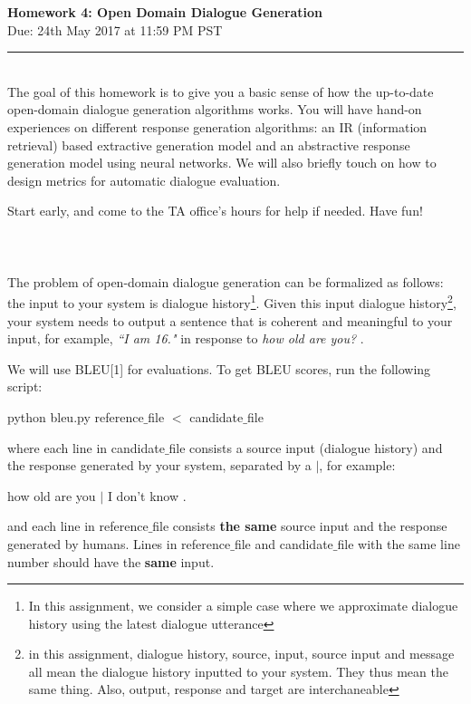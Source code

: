 \documentclass{article}
\newcommand{\ruleskip}{\bigskip\hrule\bigskip}
\begin{document}
\pagestyle{myheadings} 

\begin{center}
\Large{{\bf Homework 4: Open Domain Dialogue Generation}}\\
\large{Due: 24th May 2017 at 11:59 PM PST} 
\end{center}
\ruleskip

\\
The goal of this homework is to give you a basic sense of how the up-to-date open-domain dialogue generation algorithms works. 
You will have hand-on experiences on different response generation algorithms: an IR (information retrieval) based extractive generation model and an 
abstractive response generation model using neural networks. We will also briefly touch on how to design  metrics for automatic dialogue evaluation. 

Start early, and come to the TA office's hours for help if needed. Have fun! 
~~\\~~\\~~\\
\\
The problem of open-domain dialogue generation
 can be formalized as follows: 
the input to your system is dialogue history\footnote{In this assignment, we consider a simple case where we approximate dialogue history using the latest dialogue utterance}. 
Given this input dialogue history\footnote{in this assignment, dialogue history, source, input, source input and message all mean the dialogue history inputted to your system. They thus mean the same thing. Also, output, response and target are interchaneable}, your system needs to output a sentence  that is coherent and meaningful to your input, for example, {\it ``I am 16."}
in response to {\it how old are you?}
. 

We will use BLEU[1] for evaluations. To get BLEU scores, run the following script:
\begin{center}
python bleu.py reference$\_$file $<$ candidate$\_$file 
\end{center}
where each line in candidate$\_$file consists a source input (dialogue history) and the response generated by your system, separated by a $|$,  for example:
\begin{center}
how old are you $|$ I don't know .
\end{center}
and each line in reference$\_$file consists {\bf the same} source input and the response generated by humans.
Lines in  reference$\_$file and candidate$\_$file with the same line number should have the {\bf same} input. 
\end{document}
